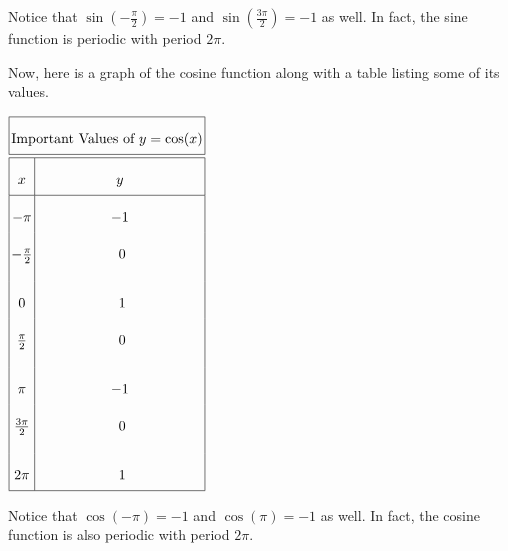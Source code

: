 \documentclass[nooutcomes]{ximera}
\begin{document}
Notice that $\sin\left(-\frac{\pi}{2}\right) = -1$ and $\sin\left(\frac{3\pi}{2}\right) = -1$ as well. In fact, the sine function is periodic with period $2\pi$. 

Now, here is a graph of the cosine function along with a table listing some of its values.

\begin{image}
\end{image}

\begin{center}
$\arraycolsep=1.4pt\def\arraystretch{2.2}
\begin{array}{ |c | c|  }
 \hline
 \multicolumn{2}{|c|}{\text{\normalfont Important Values of } y=\cos(x)} \\
\hline
 \hline
 x & y\\
 \hline

 -\pi&-1\\

 -\frac{\pi}{2}&\text{ }0\\[2ex]

 0&\text{ }1\\

 \frac{\pi}{2}&\text{ }0\\[2ex]

 \pi&-1\\

\frac{3\pi}{2}&\text{ }0\\[2ex]

 2 \pi&\text{ }1\\
\hline
\end{array}
$
\end{center} 

Notice that $\cos\left(-\pi\right) = -1$ and $\cos\left(\pi\right) = -1$ as well. In fact, the cosine function is also periodic with period $2\pi$. 
 
\end{document}
